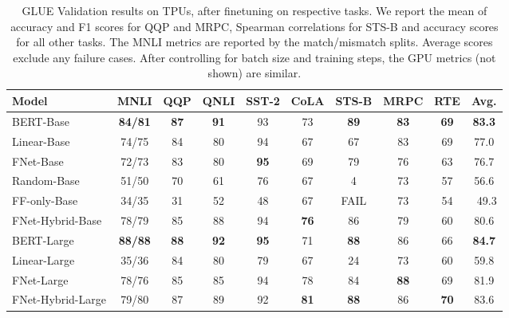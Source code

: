 \begin{table}[tb]
    \caption{GLUE Validation results on TPUs, after finetuning on respective tasks. We report the mean of accuracy and F1 scores for QQP and MRPC, Spearman correlations for STS-B and accuracy scores for all other tasks. The MNLI metrics are reported by the match/mismatch splits.
    Average scores exclude any failure cases. After controlling for batch size and training steps, the GPU metrics (not shown) are similar.}
    \label{tab:glue}
    \centering
    \begin{tabular}{l| c c c c c c c c | c}
        \hline
         Model  & MNLI & QQP & QNLI & SST-2 & CoLA & STS-B & MRPC & RTE & Avg. \\ \hline \hline
         BERT-Base & \textbf{84/81} & \textbf{87} & \textbf{91} & 93 & 73 & \textbf{89} & \textbf{83} & \textbf{69} & \textbf{83.3} \\
         Linear-Base & 74/75 & 84 & 80 & 94 & 67 & 67 & 83 & 69 & 77.0 \\
         FNet-Base & 72/73 & 83 & 80 & \textbf{95} & 69 & 79 & 76 & 63 & 76.7 \\
         Random-Base & 51/50 & 70 & 61 & 76 & 67 & 4 & 73 & 57 & 56.6 \\
         FF-only-Base & 34/35 & 31 & 52 & 48 & 67 & FAIL & 73 & 54 & \ 49.3 \\ 
         FNet-Hybrid-Base & 78/79 & 85 & 88 & 94 & \textbf{76} & 86 & 79 & 60 & 80.6 \\ \hline
         BERT-Large & \textbf{88/88} & \textbf{88} & \textbf{92} & \textbf{95} & 71 & \textbf{88} & 86 & 66 & \textbf{84.7} \\
         Linear-Large & 35/36 & 84 & 80 & 79 & 67 & 24 & 73 & 60 & 59.8 \\
         FNet-Large & 78/76 & 85 & 85 & 94 & 78 & 84 & \textbf{88} & 69 & 81.9 \\
         FNet-Hybrid-Large & 79/80 & 87 & 89 & 92 & \textbf{81} & \textbf{88} & 86 & \textbf{70} & 83.6 \\ \hline
    \end{tabular}
\end{table}

